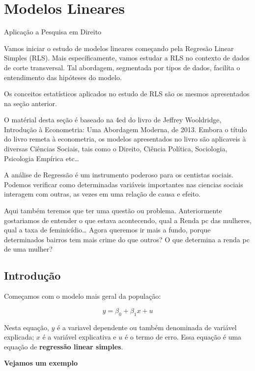 \documentclass[
  letterpaper,
  DIV=11,
  numbers=noendperiod]{scrreprt}
\begin{document}

\chapter{Modelos Lineares}\label{modelos-lineares}

Aplicação a Pesquisa em Direito

\hfill\break

Vamos iniciar o estudo de modelos lineares começando pela Regresão
Linear Simples (RLS). Mais específicamente, vamos estudar a RLS no
contexto de dados de corte transversal. Tal abordagem, segmentada por
tipos de dados, facilíta o entendimento das hipóteses do modelo.

Os conceitos estatísticos aplicados no estudo de RLS são os mesmos
apresentados na seção anterior.

O matérial desta seção é baseado na 4ed do livro de Jeffrey Wooldridge,
Introdução à Econometria: Uma Abordagem Moderna, de 2013. Embora o
título do livro remeta à econometria, os modelos apresentados no livro
são aplicaveis à diversas Ciências Sociais, tais como o Direito, Ciência
Política, Sociologia, Psicologia Empírica etc\ldots{}

A análise de Regressão é um instrumento poderoso para os centistas
sociais. Podemos verificar como determinadas variáveis importantes nas
ciencias sociais interagem com outras, as vezes em uma relação de causa
e efeito.

Aqui também teremos que ter uma questão ou problema. Anteriormente
gostariamos de entender o que estava acontecendo, qual a Renda pc das
mulheres, qual a taxa de feminicídio\ldots{} Agora queremos ir mais a
fundo, porque determinados bairros tem mais crime do que outros? O que
determina a renda pc de uma mulher?

\section{Introdução}\label{introduuxe7uxe3o-1}

Começamos com o modelo mais geral da população:

\[y = \beta_0 + \beta_1x + u \]

Nesta equação, \(y\) é a variavel dependente ou também denominada de
variável explicada; \(x\) é a variável explicativa e \(u\) é o termo de
erro. Essa equação é uma equação de \textbf{regressão linear simples}.

\textbf{Vejamos um exemplo}
\end{document}
